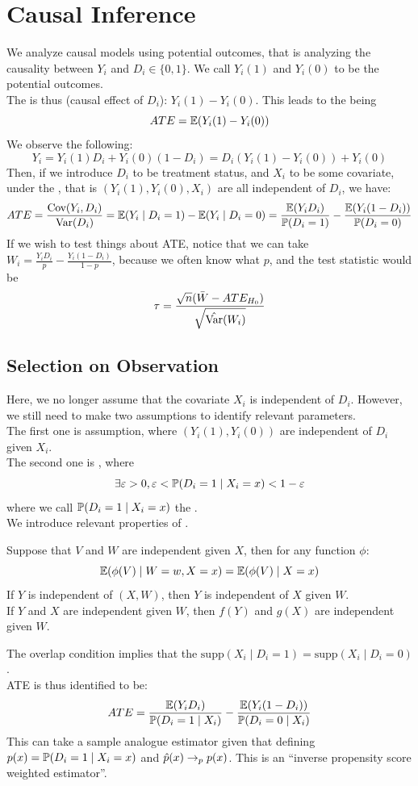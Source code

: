 \section{Causal Inference}
We analyze causal models using potential outcomes, that is analyzing the causality between $Y_i$ and $D_i \in \{0, 1\}$. We call $Y_i(1)$ and $Y_i(0)$ to be the potential outcomes. \\
The  is thus (causal effect of $D_i$): $Y_i(1) - Y_i(0)$. This leads to the  being
$$ATE = \mathbb{E}(Y_i(1) - Y_i(0))$$
We observe the following:
$$Y_i = Y_i(1)D_i + Y_i(0)(1 - D_i) = D_i(Y_i(1) - Y_i(0)) + Y_i(0)$$
Then, if we introduce $D_i$ to be treatment status, and $X_i$ to be some covariate, under the , that is $(Y_i(1), Y_i(0), X_i)$ are all independent of $D_i$, we have:
$$ATE = \frac{\text{Cov}(Y_i, D_i)}{\text{Var}(D_i)} = \mathbb{E}(Y_i \mid D_i = 1) - \mathbb{E}(Y_i \mid D_i = 0) = \frac{\mathbb{E}(Y_iD_i)}{\mathbb{P}(D_i = 1)} - \frac{\mathbb{E}(Y_i(1 - D_i))}{\mathbb{P}(D_i = 0)}$$
If we wish to test things about ATE, notice that we can take $W_i = \frac{Y_iD_i}{p} - \frac{Y_i(1 - D_i)}{1 - p}$, because we often know what $p$, and the test statistic would be
$$\tau = \frac{\sqrt{n}(\bar{W} - ATE_{H_0})}{\sqrt{\hat{\text{Var}}(W_i)}}$$

\subsection{Selection on Observation}
Here, we no longer assume that the covariate $X_i$ is independent of $D_i$. However, we still need to make two assumptions to identify relevant parameters. \\
The first one is  assumption, where $(Y_i(1), Y_i(0))$ are independent of $D_i$ given $X_i$. \\
The second one is , where
$$\exists \varepsilon > 0, \varepsilon < \mathbb{P}(D_i = 1 \mid X_i = x) < 1 - \varepsilon$$
where we call $\mathbb{P}(D_i = 1 \mid X_i = x)$ the . \\
We introduce relevant properties of .
\begin{lemma}
    Suppose that $V$ and $W$ are independent given $X$, then for any function $\phi$:
    $$\mathbb{E}(\phi(V) \mid W = w, X = x) = \mathbb{E}(\phi(V) \mid X = x)$$
    If $Y$ is independent of $(X, W)$, then $Y$ is independent of $X$ given $W$. \\
    If $Y$ and $X$ are independent given $W$, then $f(Y)$ and $g(X)$ are independent given $W$.
\end{lemma}
The overlap condition implies that the $\text{supp}(X_i \mid D_i = 1) = \text{supp}(X_i \mid D_i = 0)$. \\
ATE is thus identified to be:
$$ATE = \frac{\mathbb{E}(Y_iD_i)}{\mathbb{P}(D_i = 1 \mid X_i)} - \frac{\mathbb{E}(Y_i(1 - D_i))}{\mathbb{P}(D_i = 0 \mid X_i)}$$
This can take a sample analogue estimator given that defining $p(x) = \mathbb{P}(D_i = 1 \mid X_i = x)$ and $\hat{p}(x) \to_p p(x)$. This is an ``inverse propensity score weighted estimator''.

